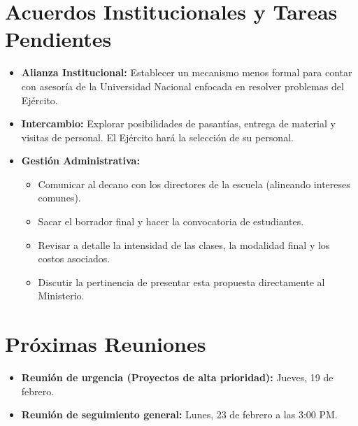 \documentclass[11pt,a4paper]{article}
\begin{document}
\section{Acuerdos Institucionales y Tareas Pendientes}
\begin{itemize}[noitemsep]
    \item \textbf{Alianza Institucional:} Establecer un mecanismo menos formal para contar con asesoría de la Universidad Nacional enfocada en resolver problemas del Ejército.
    \item \textbf{Intercambio:} Explorar posibilidades de pasantías, entrega de material y visitas de personal. El Ejército hará la selección de su personal.
    \item \textbf{Gestión Administrativa:} 
    \begin{itemize}[noitemsep]
        \item Comunicar al decano con los directores de la escuela (alineando intereses comunes).
        \item Sacar el borrador final y hacer la convocatoria de estudiantes.
        \item Revisar a detalle la intensidad de las clases, la modalidad final y los costos asociados.
        \item Discutir la pertinencia de presentar esta propuesta directamente al Ministerio.
    \end{itemize}
\end{itemize}

\section{Próximas Reuniones}
\begin{itemize}[noitemsep]
    \item \textbf{Reunión de urgencia (Proyectos de alta prioridad):} Jueves, 19 de febrero.
    \item \textbf{Reunión de seguimiento general:} Lunes, 23 de febrero a las 3:00 PM.
\end{itemize}
\end{document}
